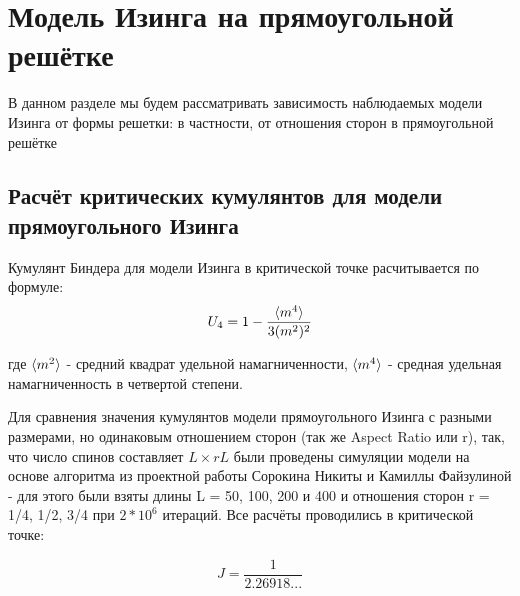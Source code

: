 \section{Модель Изинга на прямоугольной решётке}

В данном разделе мы будем рассматривать зависимость наблюдаемых модели Изинга от формы решетки: в частности, от отношения сторон в прямоугольной решётке

\subsection{Расчёт критических кумулянтов для модели прямоугольного Изинга}

Кумулянт Биндера для модели Изинга в критической точке расчитывается по формуле:
\begin{equation}
\label{eq:Cumulant}
U_{4} = 1 - \frac{\langle m^{4} \rangle}{3 (m^{2})^{2}}
\end{equation}

где $\langle m^{2} \rangle$ - средний квадрат удельной намагниченности, $\langle m^{4} \rangle$ - средная удельная намагниченность в четвертой степени. 

Для сравнения значения кумулянтов модели прямоугольного Изинга с разными размерами, но одинаковым отношением сторон (так же Aspect Ratio или r), так, что число спинов составляет $L \times rL$ были проведены симуляции модели на основе алгоритма из проектной работы Сорокина Никиты \cite{Schro} и Камиллы Файзулиной \cite{SAW} - для этого были взяты длины L = 50, 100, 200 и 400 и отношения сторон r = 1/4, 1/2, 3/4 при $2 * 10^{6}$ итераций. Все расчёты проводились в критической точке\cite{Selke}:

\begin{equation}
\label{eq:Crit_Dot}
J = \frac{1}{2.26918...}
\end{equation}



